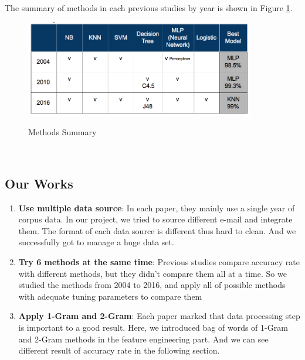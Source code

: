The summary of methods in each previous studies by year is shown in Figure \ref{method_summary}. \\

\begin{figure}[H]
	\centering
	\includegraphics[width=10cm]{Method_Summary.png}\\
	\caption{Methods Summary}
	\label{method_summary}
\end{figure}\\

\subsection{Our Works}

\begin{enumerate}
	\item \textbf{Use multiple data source}: In each paper, they mainly use a single year of corpus data. In our project, we tried to source different e-mail and integrate them. The format of each data source is different thus hard to clean. And we successfully got to manage a huge data set. 

	\item \textbf{Try 6 methods at the same time}: Previous studies compare accuracy rate with different methods, but they didn't compare them all at a time. So we studied the methods from 2004 to 2016, and apply all of possible methods with adequate tuning parameters to compare them 

	\item \textbf{Apply 1-Gram and 2-Gram}: Each paper marked that data processing step is important to a good result. Here, we introduced bag of words of 1-Gram and 2-Gram methods in the feature engineering part. And we can see different result of accuracy rate in the following section.
\end{enumerate}
